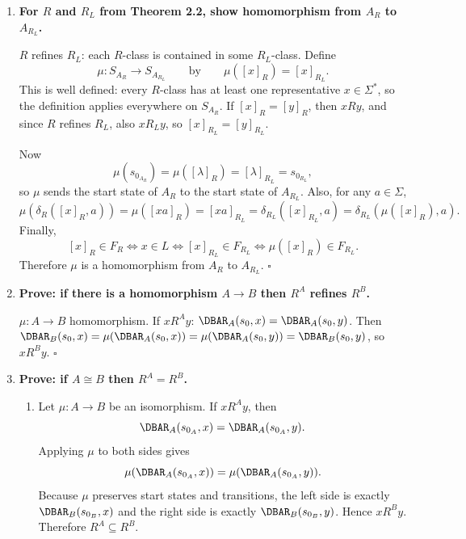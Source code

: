 \begin{enumerate}[{3.}1.]
There is a homomorphism $\mu:A\to B$ given by $\mu(p)=q_0$: initials match,
transitions are preserved, and $p\in F_A \Leftrightarrow q_0\in F_B$.

However, there is no homomorphism $\nu:B\to A$, because $q_1\in F_B$ would have
to imply $\nu(q_1)\in F_A$, and $A$ has no final state. Therefore homomorphism
is not an equivalence relation on DFAs. $\square$

\item \textbf{For $R$ and $R_L$ from Theorem 2.2, show homomorphism from $A_R$ to $A_{R_L}$.}

$R$ refines $R_L$: each $R$-class is contained in some $R_L$-class. Define
\[
\mu:S_{A_R}\to S_{A_{R_L}}
\qquad\text{by}\qquad
\mu([x]_R)=[x]_{R_L}.
\]
This is well defined: every $R$-class has at least one representative $x\in\Sigma^*$, so the definition applies everywhere on $S_{A_R}$. If $[x]_R=[y]_R$, then $xRy$, and since $R$ refines $R_L$, also $xR_Ly$, so $[x]_{R_L}=[y]_{R_L}$.

Now
\[
\mu(s_{0_{A_R}})=\mu([\lambda]_R)=[\lambda]_{R_L}=s_{0_{R_L}},
\]
so $\mu$ sends the start state of $A_R$ to the start state of $A_{R_L}$.
Also, for any $a\in\Sigma$,
\[
\mu(\delta_R([x]_R,a))
=\mu([xa]_R)
=[xa]_{R_L}
=\delta_{R_L}([x]_{R_L},a)
=\delta_{R_L}(\mu([x]_R),a).
\]
Finally,
\[
[x]_R\in F_R
\Leftrightarrow x\in L
\Leftrightarrow [x]_{R_L}\in F_{R_L}
\Leftrightarrow \mu([x]_R)\in F_{R_L}.
\]
Therefore $\mu$ is a homomorphism from $A_R$ to $A_{R_L}$. $\square$

\item \textbf{Prove: if there is a homomorphism $A\to B$ then $R^A$ refines $R^B$.}

$\mu: A\to B$ homomorphism. If $x R^A y$: $\DBAR_A(s_0,x)=\DBAR_A(s_0,y)$. Then $\DBAR_B(s_0,x)=\mu(\DBAR_A(s_0,x))=\mu(\DBAR_A(s_0,y))=\DBAR_B(s_0,y)$, so $x R^B y$. $\square$

\item \textbf{Prove: if $A\cong B$ then $R^A=R^B$.}

\begin{enumerate}
\item Let $\mu:A\to B$ be an isomorphism. If $xR^A y$, then
\[
\DBAR_A(s_{0_A},x)=\DBAR_A(s_{0_A},y).
\]
Applying $\mu$ to both sides gives
\[
\mu(\DBAR_A(s_{0_A},x))=\mu(\DBAR_A(s_{0_A},y)).
\]
Because $\mu$ preserves start states and transitions, the left side is exactly
$\DBAR_B(s_{0_B},x)$ and the right side is exactly $\DBAR_B(s_{0_B},y)$. Hence
$xR^B y$. Therefore $R^A\subseteq R^B$.


\end{enumerate}
\end{enumerate}

